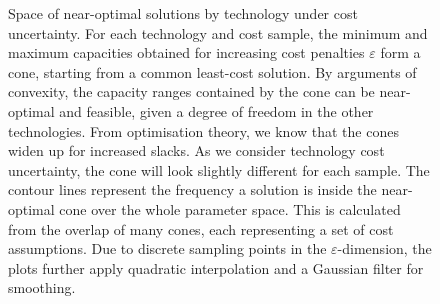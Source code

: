 \begin{figure}
    \vspace{-2cm}
    \noindent{}
    \noindent{}
    \noindent{}
    \caption{
    Space of near-optimal solutions by technology under cost uncertainty.
    For each technology and cost sample,
    the minimum and maximum capacities obtained for increasing cost penalties
    $\varepsilon$ form a cone, starting from a common least-cost solution. 
    By arguments of convexity, the capacity ranges contained by the cone can be near-optimal and feasible, given a degree of freedom in the other technologies.
    From optimisation theory, we know that the cones widen up for increased slacks.
    As we consider technology cost uncertainty, the cone will look slightly different for each sample.
    The contour lines represent the frequency a solution is inside the near-optimal cone over the whole parameter space.
    This is calculated from the overlap of many cones, each representing a set of cost assumptions.
    Due to discrete sampling points in the $\varepsilon$-dimension, the plots further apply quadratic interpolation and a Gaussian filter for smoothing.
    }
    \label{fig:fuzzycone}
\end{figure}

